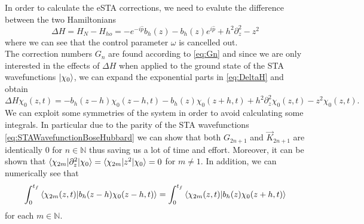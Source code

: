 In order to calculate the eSTA corrections, we need to evalute the difference between the two Hamiltonians
\begin{equation}
	\label{eq:DeltaH}
	\Delta H = H_{N} - H_{ho} =
	- e^{-i\hat{p}} b_{h}(z) - b_{h}(z)e^{i\hat{p}} + h^2 \partial_z^2 - z^2
\end{equation}
where we can see that the control parameter $ \omega $ is cancelled out.\\
The correction numbers $ G_{n} $ are found according to \cref{eq:Gn} and since we are only interested in the effects of $ \Delta H  $ when applied to the ground state of the STA wavefunctions $ \ket{\chi_{0}} $, we can expand the exponential parts in \cref{eq:DeltaH} and obtain
\begin{equation}
	\label{eq:DeltaHOnGroundState}
	\Delta H \chi_{0}(z,t) = - b_{h}(z-h)\chi_{0}(z-h,t) - b_{h}(z)\chi_{0}(z+h,t) + h^2\partial^2_{z}\chi_{0}(z,t) - z^2\chi_{0}(z,t).
\end{equation}
We can exploit some symmetries of the system in order to avoid calculating some integrals.
In particular due to the parity of the STA wavefunctions \cref{eq:STAWavefunctionBoseHubbard} we can show that both $ G_{2n+1} $ and $ \vec{K}_{2n +1} $ are identically 0 for $ n \in \mathbb{N} $ thus saving us a lot of time and effort.
Moreover, it can be shown that $ \braket{\chi_{2m}|\partial_z^{2}|\chi_{0} } = \braket{\chi_{2m}|z^{2}|\chi_{0} } = 0 $ for $ m \neq 1 $.
In addition, we can numerically see that
\begin{equation}
    \int_{0}^{t_{f}}\braket{\chi_{2m}(z,t)|b_{h}(z-h)\chi_{0}(z-h,t)} =     \int_{0}^{t_{f}}\braket{\chi_{2m}(z,t)|b_{h}(z)\chi_{0}(z+h,t)}
\label{eq:bhEquality}
\end{equation}
for each $ m \in \mathbb{N} $.
